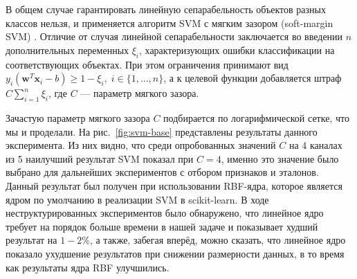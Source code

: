 В общем случае гарантировать линейную сепарабельность объектов разных классов нельзя, и применяется алгоритм SVM с мягким зазором (soft-margin SVM) \cite{cortes-vapnik}. Отличие от случая линейной сепарабельности заключается во введении \(n\) дополнительных переменных \(\xi_i\), характеризующих ошибки классификации на соответствующих объектах. При этом ограничения принимают вид \(y_i\left(\mathbf{w}^T\mathbf{x}_i - b\right)\geqslant 1-\xi_i,\;i\in\{1,\dotsc,n\}\), а к целевой функции добавляется штраф \(C\sum_{i=1}^n\xi_i\), где \(C\) --- параметр мягкого зазора.

Зачастую параметр мягкого зазора \(C\) подбирается по логарифмической сетке, что мы и проделали. На рис.~\ref{fig:svm-base} представлены результаты данного эксперимента. Из них видно, что среди опробованных значений \(C\) на 4 каналах из 5 наилучший результат SVM показал при \(C=4\), именно это значение было выбрано для дальнейших экспериментов с отбором признаков и эталонов. Данный результат был получен при использовании RBF-ядра, которое является ядром по умолчанию в реализации SVM в scikit-learn. В ходе неструктурированных экспериментов было обнаружено, что линейное ядро требует на порядок больше времени в нашей задаче и показывает худший результат на \(1-2\%\), а также, забегая вперёд, можно сказать, что линейное ядро показало ухудшение результатов при снижении размерности данных, в то время как результаты ядра RBF улучшились.

